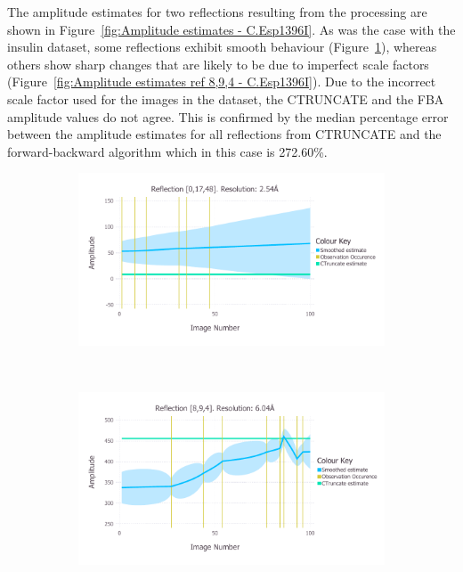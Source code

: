 The amplitude estimates for two reflections resulting from the processing are shown in Figure~\ref{fig:Amplitude estimates - C.Esp1396I}.
As was the case with the insulin dataset, some reflections exhibit smooth behaviour (Figure~\ref{fig:Amplitude estimates ref 0,17,48 - C.Esp1396I}), whereas others show sharp changes that are likely to be due to imperfect scale factors (Figure~\ref{fig:Amplitude estimates ref 8,9,4 - C.Esp1396I}).
Due to the incorrect scale factor used for the images in the dataset, the CTRUNCATE and the FBA amplitude values do not agree.
This is confirmed by the median percentage error between the amplitude estimates for all reflections from CTRUNCATE and the forward-backward algorithm which in this case is 272.60\%.
\begin{figure}
    \centering
    \begin{subfigure}[b]{1.0\textwidth}
            \centering
            \includegraphics[width=\textwidth]{figures/datared/SmoothedPlot_0,17,48_res3.pdf}
            \caption{}
            \label{fig:Amplitude estimates ref 0,17,48 - C.Esp1396I}
    \end{subfigure}
    \\
    \begin{subfigure}[b]{1.0\textwidth}
            \centering
            \includegraphics[width=\textwidth]{figures/datared/SmoothedPlot_8,9,4_res6.pdf}

\end{subfigure}
\end{figure}
